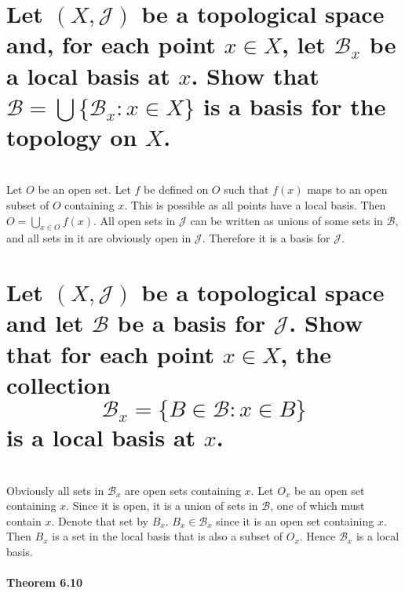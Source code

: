 \begin{parts}
 \part{Let $(X, \mathcal{J})$ be a topological space and, for each point $x \in X$, let $\mathcal{B}_x$ be a local basis at $x$. Show that $\mathcal{B} = \bigcup \{\mathcal{B}_x:x \in X\}$ is a basis for the topology on $X$.}
 
\begin{solution}
\\ Let $O$ be an open set. Let $f$ be defined on $O$ such that $f(x)$ maps to an open subset of $O$ containing $x$. This is possible as all points have a local basis. Then $O = \bigcup_{x \in O} f(x)$. All open sets in $\mathcal{J}$ can be written as unions of some sets in $\mathcal{B}$, and all sets in it are obviously open in $\mathcal{J}$. Therefore it is a basis for $\mathcal{J}$.
 \end{solution}
 
 \part{Let $(X, \mathcal{J})$ be a topological space and let $\mathcal{B}$ be a basis for $\mathcal{J}$. Show that for each point $x \in X$, the collection $$\mathcal{B}_x = \{B \in \mathcal{B}: x \in B\}$$ is a local basis at $x$.}
 
\begin{solution}
 \\Obviously all sets in $\mathcal{B}_x$ are open sets containing $x$. Let $O_x$ be an open set containing $x$. Since it is open, it is a union of sets in $\mathcal{B}$, one of which must contain $x$. Denote that set by $B_x$. $B_x \in \mathcal{B}_x$ since it is an open set containing $x$. Then $B_x$ is a set in the local basis that is also a subset of $O_x$. Hence $\mathcal{B}_x$ is a local basis.
\end{solution}
 \end{parts}
 
 \subsection{Theorem 6.10}
 \setcounter{question}{0}
 
 
